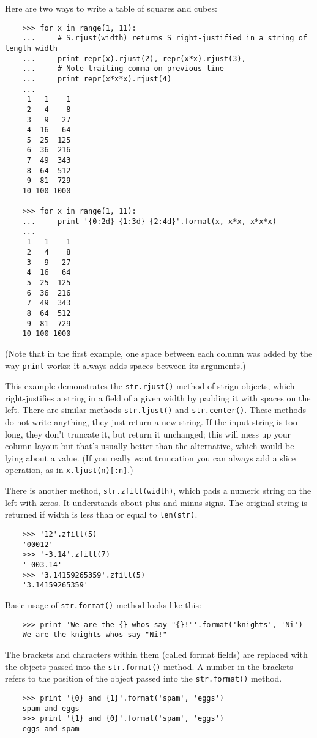 \documentclass[UTF8]{article}
\begin{document}
Here are two ways to write a table of squares and cubes:
\begin{verbatim}
    >>> for x in range(1, 11):
    ...     # S.rjust(width) returns S right-justified in a string of length width
    ...     print repr(x).rjust(2), repr(x*x).rjust(3),
    ...     # Note trailing comma on previous line
    ...     print repr(x*x*x).rjust(4)
    ...
     1   1    1
     2   4    8
     3   9   27
     4  16   64
     5  25  125
     6  36  216
     7  49  343
     8  64  512
     9  81  729
    10 100 1000

    >>> for x in range(1, 11):
    ...     print '{0:2d} {1:3d} {2:4d}'.format(x, x*x, x*x*x)
    ...
     1   1    1
     2   4    8
     3   9   27
     4  16   64
     5  25  125
     6  36  216
     7  49  343
     8  64  512
     9  81  729
    10 100 1000
\end{verbatim}
(Note that in the first example, one space between each column was added by the way \texttt{print}
works: it always adds spaces between its arguments.)

This example demonstrates the \texttt{str.rjust()} method of strign objects, which right-justifies
a string in a field of a given width by padding it with spaces on the left. There are similar
methods \texttt{str.ljust()} and \texttt{str.center()}. These methods do not write anything, they
just return a new string. If the input string is too long, they don't truncate it, but return it
unchanged; this will mess up your column layout but that's usually better than the alternative,
which would be lying about a value. (If you really want truncation you can always add a slice
operation, as in \texttt{x.ljust(n)[:n]}.)

There is another method, \texttt{str.zfill(width)}, which pads a numeric string on the left with
zeros. It understands about plus and minus signs. The original string is returned if width is less
than or equal to \texttt{len(str)}.
\begin{verbatim}
    >>> '12'.zfill(5)
    '00012'
    >>> '-3.14'.zfill(7)
    '-003.14'
    >>> '3.14159265359'.zfill(5)
    '3.14159265359'
\end{verbatim}

Basic usage of \texttt{str.format()} method looks like this:
\begin{verbatim}
    >>> print 'We are the {} whos say "{}!"'.format('knights', 'Ni')
    We are the knights whos say "Ni!"
\end{verbatim}

The brackets and characters within them (called format fields) are replaced with the objects passed
into the \texttt{str.format()} method. A number in the brackets refers to the position of the
object passed into the \texttt{str.format()} method.
\begin{verbatim}
    >>> print '{0} and {1}'.format('spam', 'eggs')
    spam and eggs
    >>> print '{1} and {0}'.format('spam', 'eggs')
    eggs and spam
\end{verbatim}
\end{document}
